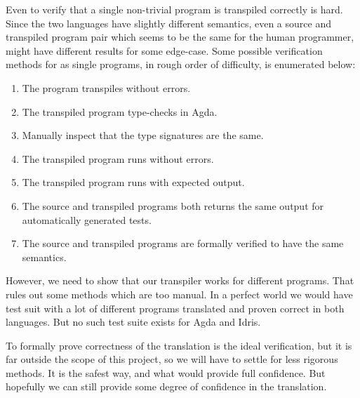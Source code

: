 \documentclass[parskip=half]{scrartcl}
\begin{document}
Even to verify that a single non-trivial program is transpiled correctly is
hard. Since the two languages have slightly different semantics, even a source
and transpiled program pair which seems to be the same for the human
programmer, might have different results for some edge-case. Some possible
verification methods for as single programs, in rough order of difficulty, is
enumerated below:

\begin{enumerate}
\item The program transpiles without errors.
\item The transpiled program type-checks in Agda.
\item Manually inspect that the type signatures are the same.
\item The transpiled program runs without errors.
\item The transpiled program runs with expected output.
\item The source and transpiled programs both returns the same output for
  automatically generated tests.
\item The source and transpiled programs are formally verified to have the same
  semantics.
\end{enumerate}


However, we need to show that our transpiler works for different programs.
That rules out some methods which are too manual.  In a perfect world we would
have test suit with a lot of different programs translated and proven correct in
both languages. But no such test suite exists for Agda and Idris.


To formally prove correctness of the translation is the ideal verification, but
it is far outside the scope of this project, so we will have to settle for less
rigorous methods. It is the safest way, and what would provide full confidence.
But hopefully we can still provide some degree of confidence in the
translation.
\end{document}
